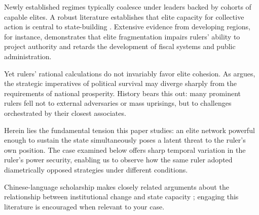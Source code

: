 
Newly established regimes typically coalesce under leaders backed by cohorts
of capable elites. A robust literature establishes that elite capacity for
collective action is central to state-building \citep{author2018book,author2020example}.
Extensive evidence from developing regions, for instance, demonstrates that
elite fragmentation impairs rulers' ability to project authority and retards
the development of fiscal systems and public administration.


Yet rulers' rational calculations do not invariably favor elite cohesion.
As \citet{author2019chapter} argues, the strategic imperatives of political
survival may diverge sharply from the requirements of national prosperity.
History bears this out: many prominent rulers fell not to external adversaries
or mass uprisings, but to challenges orchestrated by their closest associates.

Herein lies the fundamental tension this paper studies: an elite network
powerful enough to sustain the state simultaneously poses a latent threat to
the ruler's own position. The case examined below offers sharp temporal
variation in the ruler's power security, enabling us to observe how the same
ruler adopted diametrically opposed strategies under different conditions.

Chinese-language scholarship makes closely related arguments about the
relationship between institutional change and state capacity
\citep{zhang2018example}; engaging this literature is encouraged when
relevant to your case.
